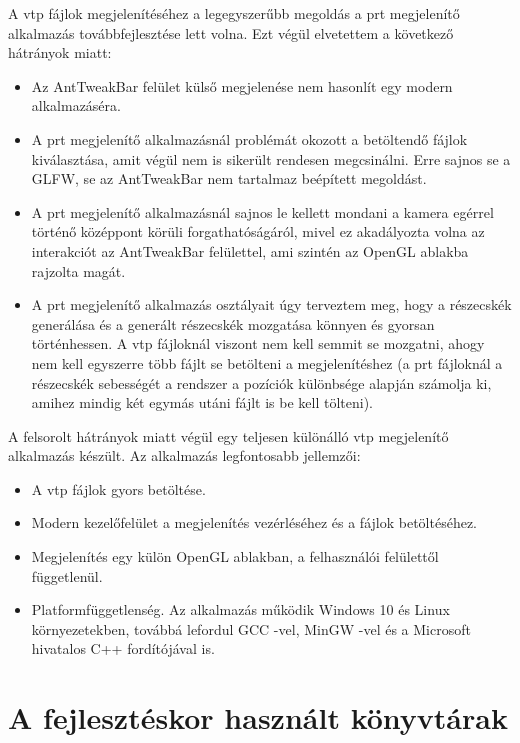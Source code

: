 A vtp fájlok megjelenítéséhez a legegyszerűbb megoldás 
a prt megjelenítő alkalmazás továbbfejlesztése lett volna.
Ezt végül elvetettem a következő hátrányok miatt:
\begin{itemize}
\item Az AntTweakBar felület külső megjelenése 
nem hasonlít egy modern alkalmazáséra.
\item A prt megjelenítő alkalmazásnál problémát okozott 
a betöltendő fájlok kiválasztása, 
amit végül nem is sikerült rendesen megcsinálni. 
Erre sajnos se a GLFW, se az AntTweakBar 
nem tartalmaz beépített megoldást.
\item A prt megjelenítő alkalmazásnál sajnos 
le kellett mondani a kamera egérrel 
történő középpont körüli forgathatóságáról, 
mivel ez akadályozta volna az interakciót 
az AntTweakBar felülettel, 
ami szintén az OpenGL ablakba rajzolta magát.
\item 
A prt megjelenítő alkalmazás osztályait 
úgy terveztem meg, 
hogy a részecskék generálása és a generált részecskék mozgatása könnyen 
és gyorsan történhessen. 
A vtp fájloknál viszont nem kell semmit se mozgatni, 
ahogy nem kell egyszerre több fájlt se betölteni 
a megjelenítéshez (a prt fájloknál a részecskék sebességét 
a rendszer a pozíciók különbsége alapján számolja ki, 
amihez mindig két egymás utáni fájlt is be kell tölteni).
\end{itemize}
A felsorolt hátrányok miatt végül egy teljesen különálló 
vtp megjelenítő alkalmazás készült. 
Az alkalmazás legfontosabb jellemzői:
\begin{itemize}
\item A vtp fájlok gyors betöltése.
\item Modern kezelőfelület a megjelenítés vezérléséhez és a fájlok betöltéséhez.
\item Megjelenítés egy külön OpenGL ablakban, 
a felhasználói felülettől függetlenül.
\item Platformfüggetlenség. 
Az alkalmazás működik Windows 10 és Linux környezetekben, 
továbbá lefordul GCC -vel, MinGW -vel és 
a Microsoft hivatalos C++ fordítójával is.
\end{itemize}

\section{A fejlesztéskor használt könyvtárak}

